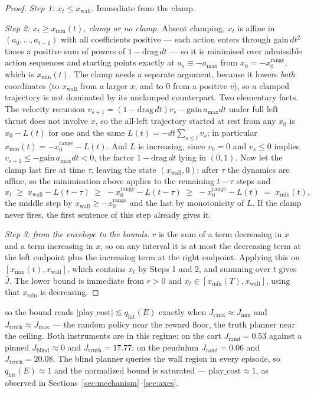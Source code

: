 \documentclass[11pt]{article}
\theoremstyle{definition}
\theoremstyle{remark}
\begin{document}
\begin{proof}
\emph{Step 1: $x_t \leq x_\mathrm{wall}$.} Immediate from the clamp.

\emph{Step 2: $x_t \geq x_{\min}(t)$, clamp or no clamp.} Absent clamping, $x_t$ is affine in $(a_0,\dots,a_{t-1})$ with all coefficients positive --- each action enters through $\mathrm{gain}\,dt^2$ times a positive sum of powers of $1-\mathrm{drag}\,dt$ --- so it is minimised over admissible action sequences and starting points exactly at $a_s \equiv -a_{\max}$ from $x_0 = -x_0^{\mathrm{range}}$, which is $x_{\min}(t)$. The clamp needs a separate argument, because it lowers \emph{both} coordinates (to $x_\mathrm{wall}$ from a larger $x$, and to $0$ from a positive $v$), so a clamped trajectory is not dominated by its unclamped counterpart. Two elementary facts. The velocity recursion $v_{s+1} = (1-\mathrm{drag}\,dt)v_s - \mathrm{gain}\,a_{\max}dt$ under full left thrust does not involve $x$, so the all-left trajectory started at rest from any $x_0$ is $x_0 - L(t)$ for one and the same $L(t) = -dt\sum_{s \leq t} v_s$; in particular $x_{\min}(t) = -x_0^{\mathrm{range}} - L(t)$. And $L$ is increasing, since $v_0 = 0$ and $v_s \leq 0$ implies $v_{s+1} \leq -\mathrm{gain}\,a_{\max}dt < 0$, the factor $1-\mathrm{drag}\,dt$ lying in $(0,1)$. Now let the clamp last fire at time $\tau$, leaving the state $(x_\mathrm{wall}, 0)$; after $\tau$ the dynamics are affine, so the minimisation above applies to the remaining $t-\tau$ steps and
\[
  x_t \;\geq\; x_\mathrm{wall} - L(t-\tau) \;\geq\; -x_0^{\mathrm{range}} - L(t-\tau) \;\geq\; -x_0^{\mathrm{range}} - L(t) \;=\; x_{\min}(t),
\]
the middle step by $x_\mathrm{wall} \geq -x_0^{\mathrm{range}}$ and the last by monotonicity of $L$. If the clamp never fires, the first sentence of this step already gives it.

\emph{Step 3: from the envelope to the bounds.} $r$ is the sum of a term decreasing in $x$ and a term increasing in $x$, so on any interval it is at most the decreasing term at the left endpoint plus the increasing term at the right endpoint. Applying this on $[x_{\min}(t), x_\mathrm{wall}]$, which contains $x_t$ by Steps 1 and 2, and summing over $t$ gives $\bar J$. The lower bound is immediate from $r > 0$ and $x_t \in [x_{\min}(T), x_\mathrm{wall}]$, using that $x_{\min}$ is decreasing.
\end{proof}

so the bound reads $|\mathrm{play\_cost}| \lesssim q_{\mathrm{hit}}(E)$ exactly when $J_{\mathrm{rand}} \approx J_{\min}$ and $J_{\mathrm{truth}} \approx J_{\max}$ --- the random policy near the reward floor, the truth planner near the ceiling. Both instruments are in this regime: on the cart $J_{\mathrm{rand}} = 0.53$ against a pinned $J_{\mathrm{blind}} \approx 0$ and $J_{\mathrm{truth}} = 17.77$; on the pendulum $J_{\mathrm{rand}} = 0.06$ and $J_{\mathrm{truth}} = 20.08$. The blind planner queries the wall region in every episode, so $q_{\mathrm{hit}}(E) \approx 1$ and the normalized bound is saturated --- $\mathrm{play\_cost} \approx 1$, as observed in Sections~\ref{sec:mechanism}--\ref{sec:axes}.
\end{document}
